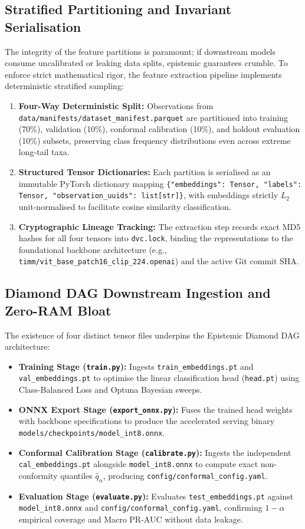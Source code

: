 \subsection{Stratified Partitioning and Invariant Serialisation}

The integrity of the feature partitions is paramount; if downstream models consume uncalibrated or leaking data splits, epistemic guarantees crumble. To enforce strict mathematical rigor, the feature extraction pipeline implements deterministic stratified sampling:
\begin{enumerate}
    \item \textbf{Four-Way Deterministic Split:} Observations from \texttt{data/manifests/dataset\_manifest.parquet} are partitioned into training (70\%), validation (10\%), conformal calibration (10\%), and holdout evaluation (10\%) subsets, preserving class frequency distributions even across extreme long-tail taxa.
    \item \textbf{Structured Tensor Dictionaries:} Each partition is serialised as an immutable PyTorch dictionary mapping \texttt{\{"embeddings": Tensor, "labels": Tensor, "observation\_uuids": list[str]\}}, with embeddings strictly $L_2$ unit-normalised to facilitate cosine similarity classification.
    \item \textbf{Cryptographic Lineage Tracking:} The extraction step records exact MD5 hashes for all four tensors into \texttt{dvc.lock}, binding the representations to the foundational backbone architecture (e.g., \texttt{timm/vit\_base\_patch16\_clip\_224.openai}) and the active Git commit SHA.
\end{enumerate}

\subsection{Diamond DAG Downstream Ingestion and Zero-RAM Bloat}

The existence of four distinct tensor files underpins the Epistemic Diamond DAG architecture:
\begin{itemize}
    \item \textbf{Training Stage (\texttt{train.py}):} Ingests \texttt{train\_embeddings.pt} and \texttt{val\_embeddings.pt} to optimise the linear classification head (\texttt{head.pt}) using Class-Balanced Loss and Optuna Bayesian sweeps.
    \item \textbf{ONNX Export Stage (\texttt{export\_onnx.py}):} Fuses the trained head weights with backbone specifications to produce the accelerated serving binary \texttt{models/checkpoints/model\_int8.onnx}.
    \item \textbf{Conformal Calibration Stage (\texttt{calibrate.py}):} Ingests the independent \texttt{cal\_embeddings.pt} alongside \texttt{model\_int8.onnx} to compute exact non-conformity quantiles $\hat{q}_\alpha$, producing \texttt{config/conformal\_config.yaml}.
    \item \textbf{Evaluation Stage (\texttt{evaluate.py}):} Evaluates \texttt{test\_embeddings.pt} against \texttt{model\_int8.onnx} and \texttt{config/conformal\_config.yaml}, confirming $1-\alpha$ empirical coverage and Macro PR-AUC without data leakage.
\end{itemize}

